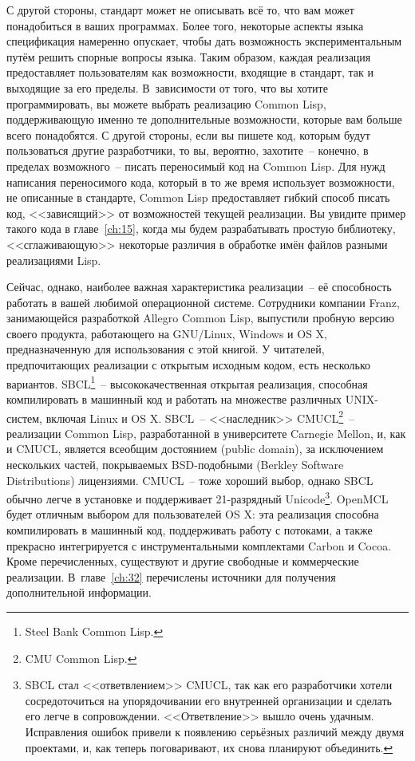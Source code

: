 С другой стороны, стандарт может не описывать всё то, что вам может понадобиться в ваших
программах. Более того, некоторые аспекты языка спецификация намеренно опускает, чтобы
дать возможность экспериментальным путём решить спорные вопросы языка.  Таким образом,
каждая реализация предоставляет пользователям как возможности, входящие в стандарт, так и
выходящие за его пределы. В~зависимости от того, что вы хотите программировать, вы можете
выбрать реализацию Common Lisp, поддерживающую именно те дополнительные возможности,
которые вам больше всего понадобятся. С другой стороны, если вы пишете код, которым будут
пользоваться другие разработчики, то вы, вероятно, захотите~-- конечно, в пределах
возможного~-- писать переносимый код на Common Lisp. Для нужд написания переносимого кода,
который в то же время использует возможности, не описанные в стандарте, Common Lisp
предоставляет гибкий способ писать код, <<зависящий>> от возможностей текущей
реализации. Вы увидите пример такого кода в главе~\ref{ch:15}, когда мы будем
разрабатывать простую библиотеку, <<сглаживающую>> некоторые различия в обработке имён
файлов разными реализациями Lisp.

Сейчас, однако, наиболее важная характеристика реализации~-- её способность работать в
вашей любимой операционной системе. Сотрудники компании Franz, занимающейся разработкой
Allegro Common Lisp, выпустили пробную версию своего продукта, работающего на GNU/Linux,
Windows и OS X, предназначенную для использования с этой книгой. У читателей,
предпочитающих реализации с открытым исходным кодом, есть несколько
вариантов. SBCL\footnote{Steel Bank Common Lisp.}~-- высококачественная открытая
реализация, способная компилировать в машинный код и работать на множестве различных
UNIX-систем, включая Linux и OS X. SBCL~-- <<наследник>> CMUCL\footnote{CMU Common
  Lisp.}~-- реализации Common Lisp, разработанной в университете Carnegie Mellon,
и, как и CMUCL, является всеобщим достоянием (public domain), за исключением нескольких
частей, покрываемых BSD-подобными (Berkley Software Distributions) лицензиями. CMUCL~--
тоже хороший выбор, однако SBCL обычно легче в установке и поддерживает 21-разрядный
Unicode\footnote{SBCL стал <<ответвлением>> CMUCL, так как его разработчики хотели
  сосредоточиться на упорядочивании его внутренней организации и сделать его легче в
  сопровождении. <<Ответвление>> вышло очень удачным. Исправления ошибок привели к появлению
  серьёзных различий между двумя проектами, и, как теперь поговаривают, их снова планируют
  объединить.}. OpenMCL будет отличным выбором для пользователей OS X: эта
реализация способна компилировать в машинный код, поддерживать работу с потоками, а также
прекрасно интегрируется с инструментальными комплектами Carbon и Cocoa. Кроме
перечисленных, существуют и другие свободные и коммерческие реализации. В~главе~\ref{ch:32}
перечислены источники для получения дополнительной информации.

